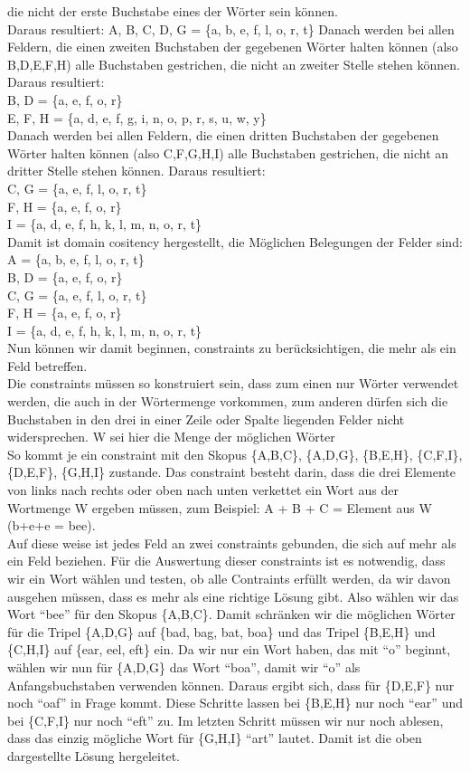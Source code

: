 \documentclass[a4paper,10pt]{article}
\begin{document}
die nicht der erste Buchstabe eines der Wörter sein können.\\
Daraus resultiert: 
A, B, C, D, G = \{a, b, e, f, l, o, r, t\}
Danach werden bei allen Feldern, die einen zweiten Buchstaben der gegebenen Wörter halten können (also B,D,E,F,H) alle Buchstaben gestrichen, die nicht an zweiter 
Stelle stehen können.
Daraus resultiert: \\
B, D = \{a, e, f, o, r\}\\
E, F, H = \{a, d, e, f, g, i, n, o, p, r, s, u, w, y\}\\
Danach werden bei allen Feldern, die einen dritten Buchstaben der gegebenen Wörter halten können (also C,F,G,H,I) alle Buchstaben gestrichen, die nicht an dritter 
Stelle stehen können.
Daraus resultiert:\\
C, G = \{a, e, f, l, o, r, t\}\\
F, H = \{a, e, f, o, r\}\\
I =    \{a, d, e, f, h, k, l, m, n, o, r, t\}\\
Damit ist domain cositency hergestellt, die Möglichen Belegungen der Felder sind:\\
A = \{a, b, e, f, l, o, r, t\}\\
B, D = \{a, e, f, o, r\}\\
C, G = \{a, e, f, l, o, r, t\}\\
F, H = \{a, e, f, o, r\}\\
I    = \{a, d, e, f, h, k, l, m, n, o, r, t\}\\
Nun können wir damit beginnen, constraints zu berücksichtigen, die mehr als ein Feld betreffen.\\
Die constraints müssen so konstruiert sein, dass zum einen nur Wörter verwendet werden, die auch in der Wörtermenge vorkommen, 
zum anderen dürfen sich die Buchstaben in den drei in einer Zeile oder Spalte liegenden Felder nicht 
widersprechen. W sei hier die Menge der möglichen Wörter\\
So kommt je ein constraint mit den Skopus \{A,B,C\}, \{A,D,G\}, \{B,E,H\}, \{C,F,I\}, \{D,E,F\}, \{G,H,I\} zustande.
Das constraint besteht darin, dass die drei Elemente von links nach rechts oder oben nach unten verkettet ein Wort aus der Wortmenge 
W ergeben müssen, zum Beispiel: A + B + C = Element aus W (b+e+e = bee).\\
Auf diese weise ist jedes Feld an zwei constraints gebunden, die sich auf mehr als ein Feld beziehen.
Für die Auswertung dieser constraints ist es notwendig, dass wir ein Wort wählen und testen, ob alle Contraints erfüllt werden, da 
wir davon ausgehen müssen, dass es mehr als eine richtige Lösung gibt.
Also wählen wir das Wort ``bee'' für den Skopus \{A,B,C\}.
Damit schränken wir die möglichen Wörter für die Tripel \{A,D,G\} auf \{bad, bag, bat, boa\} und das Tripel \{B,E,H\} und \{C,H,I\} auf 
\{ear, eel, eft\} ein. Da wir nur ein Wort haben, das mit ``o'' beginnt, wählen wir nun für \{A,D,G\} das Wort ``boa'', damit wir ``o'' als Anfangsbuchstaben 
verwenden können. Daraus ergibt sich, dass für \{D,E,F\} nur noch ``oaf'' in Frage kommt. Diese Schritte lassen bei 
\{B,E,H\} nur noch ``ear'' und bei \{C,F,I\} nur noch ``eft'' zu. Im letzten Schritt müssen wir nur noch ablesen, dass das einzig mögliche Wort für
\{G,H,I\} ``art'' lautet. Damit ist die oben dargestellte Lösung hergeleitet.
\end{document}
